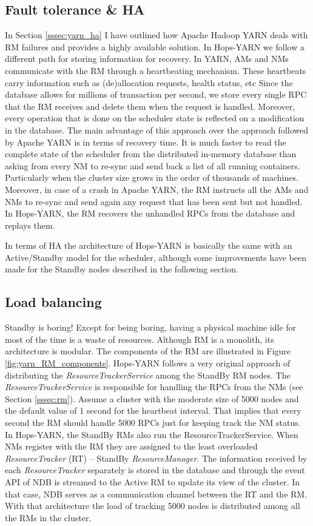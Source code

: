 \subsection{Fault tolerance \& HA}
\label{ssec:hopsyarn_fault_tol_ha}
In Section \ref{sssec:yarn_ha} I have outlined how Apache Hadoop YARN
deals with RM failures and provides a highly available solution. In
Hops-YARN we follow a different path for storing information for
recovery. In YARN, AMs and NMs communicate with the RM through a
heartbeating mechanism. These heartbeats carry information such as
(de)allocation requests, health status, etc Since the database allows
for millions of transaction per second, we store every single RPC that
the RM receives and delete them when the request is handled. Moreover,
every operation that is done on the scheduler state is reflected on a
modification in the database. The main advantage of this approach over
the approach followed by Apache YARN is in terms of recovery
time. It is much faster to read the complete state of the scheduler from the
distributed in-memory database than asking from every NM to re-sync
and send back a list of all running containers. Particularly when
the cluster size grows in the order of thousands of
machines. Moreover, in case of a crash in Apache YARN, the RM
instructs all the AMs and NMs to re-sync and send again any request
that has been sent but not handled. In Hops-YARN, the RM recovers the
unhandled RPCs from the database and replays them.

In terms of HA the architecture of Hops-YARN is basically the same
with an Active/Standby model for the scheduler, although some
improvements have been made for the Standby nodes described in the
following section.

\subsection{Load balancing}
\label{ssec:hops_yarn_load_balance}
Standby is boring! Except for being boring, having a physical machine
idle for most of the time is a waste of resources. Although RM is a
monolith, its architecture is modular. The components of the RM are illustrated in
Figure \ref{fig:yarn_RM_components}. Hops-YARN follows a very original
approach of distributing the \emph{ResourceTrackerService} among the
StandBy RM nodes. The \emph{ResourceTrackerService} is responsible for
handling the RPCs from the NMs (see Section \ref{sssec:rm}). Assume a
cluster with the moderate size of 5000 nodes and the default value of 1
second for the heartbeat interval. That implies that every second the
RM should handle 5000 RPCs just for keeping track the NM status. In
Hops-YARN, the StandBy RMs also run the
ResourceTrackerService. When NMs register with the RM they are
assigned to the least overloaded \emph{ResourceTracker} (RT) -- StandBy
\emph{ResourceManager}. The information received by each
\emph{ResourceTracker} separately is stored in the
database and through the event API of NDB is streamed to the Active
RM to update its view of the cluster. In that case, NDB serves as a
communication channel between the RT and the RM. With that
architecture the load of tracking 5000 nodes is distributed among all
the RMs in the cluster.